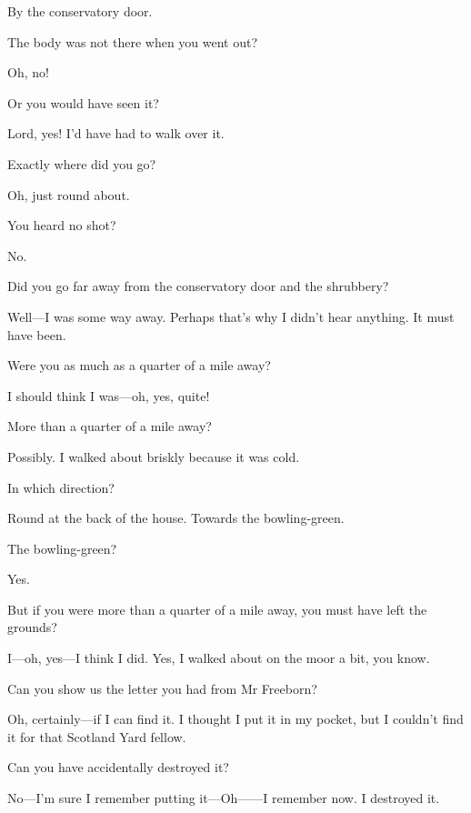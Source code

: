 \begin{dialogue}
 By the conservatory door.

 The body was not there when you went out?

 Oh, no!

 Or you would have seen it?

 Lord, yes! I'd have had to walk over it.

 Exactly where did you go?

  Oh, just round about.

 You heard no shot?

 No.

 Did you go far away from the conservatory door and the shrubbery?

 Well—I was some way away. Perhaps that's why I didn't hear anything. It must have been.

 Were you as much as a quarter of a mile away?

 I should think I was—oh, yes, quite!

 More than a quarter of a mile away?

 Possibly. I walked about briskly because it was cold.

 In which direction?

  Round at the back of the house.  Towards the bowling-green.

 The bowling-green?

  Yes.

 But if you were more than a quarter of a mile away, you must have left the grounds?

 I—oh, yes—I think I did. Yes, I walked about on the moor a bit, you know.

 Can you show us the letter you had from Mr Freeborn?

 Oh, certainly—if I can find it. I thought I put it in my pocket, but I couldn't find it for that Scotland Yard fellow.

 Can you have accidentally destroyed it?

 No—I'm sure I remember putting it—Oh——I remember now. I destroyed it.


\end{dialogue}

